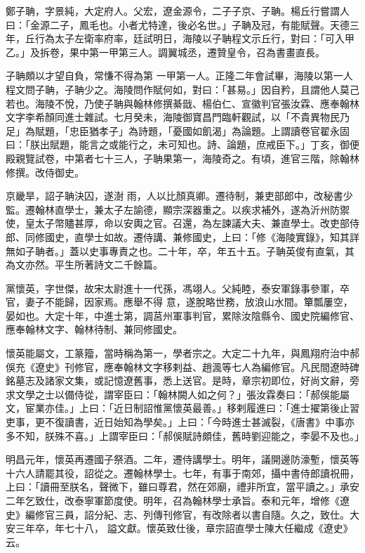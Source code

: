 \begin{pinyinscope}
 鄭子聃，字景純，大定府人。父宏，遼金源令，二子子京、子聃。楊丘行嘗謂人曰：「金源二子，鳳毛也。小者尤特達，後必名世。」子聃及冠，有能賦聲。天德三年，丘行為太子左衛率府率，廷試明日，海陵以子聃程文示丘行，對曰：「可入甲乙。」及拆卷，果中第一甲第三人。調翼城丞，遷贊皇令，召為書畫直長。



 子聃頗以才望自負，常慊不得為第
 一甲第一人。正隆二年會試畢，海陵以第一人程文問子聃，子聃少之。海陵問作賦何如，對曰：「甚易。」因自矜，且謂他人莫己若也。海陵不悅，乃使子聃與翰林修撰綦戩、楊伯仁、宣徽判官張汝霖、應奉翰林文字李希顏同進士雜試。七月癸未，海陵御寶昌門臨軒觀試，以「不貴異物民乃足」為賦題，「忠臣猶孝子」為詩題，「憂國如飢渴」為論題。上謂讀卷官翟永固曰：「朕出賦題，能言之或能行之，未可知也。詩、論題，庶戒臣下。」丁亥，御便殿親覽試卷，中第者七十三人，子聃果第一，海陵奇之。有頃，進官三階，除翰林修撰。改侍御史。



 京畿旱，詔子聃決囚，遂澍
 雨，人以比顏真卿。遷待制，兼吏部郎中，改秘書少監。遷翰林直學士，兼太子左諭德，顯宗深器重之。以疾求補外，遂為沂州防禦使，皇太子幣贐甚厚，命以安輿之官。召還，為左諫議大夫、兼直學士。改吏部侍郎、同修國史，直學士如故。遷侍講、兼修國史，上曰：「修《海陵實錄》，知其詳無如子聃者。」蓋以史事專責之也。二十年，卒，年五十五。子聃英俊有直氣，其為文亦然。平生所著詩文二千餘篇。



 黨懷英，字世傑，故宋太尉進十一代孫，馮翊人。父純睦，泰安軍錄事參軍，卒官，妻子不能歸，因家焉。應舉不得
 意，遂脫略世務，放浪山水間。簞瓢屢空，晏如也。大定十年，中進士第，調莒州軍事判官，累除汝陰縣令、國史院編修官、應奉翰林文字、翰林待制、兼同修國史。



 懷英能屬文，工篆籀，當時稱為第一，學者宗之。大定二十九年，與鳳翔府治中郝俁充《遼史》刊修官，應奉翰林文字移剌益、趙渢等七人為編修官。凡民間遼時碑銘墓志及諸家文集，或記憶遼舊事，悉上送官。是時，章宗初即位，好尚文辭，旁求文學之士以備侍從，謂宰臣曰：「翰林闕人如之何？」張汝霖奏曰：「郝俁能屬文，宦業亦佳。」上曰：「近日制詔惟黨懷英最善。」移剌履進曰：「進士擢第後止習
 吏事，更不復讀書，近日始知為學矣。」上曰：「今時進士甚滅裂，《唐書》中事亦多不知，朕殊不喜。」上謂宰臣曰：「郝俁賦詩頗佳，舊時劉迎能之，李晏不及也。」



 明昌元年，懷英再遷國子祭酒。二年，遷侍講學士。明年，議開邊防濠塹，懷英等十六人請罷其役，詔從之。遷翰林學士。七年，有事于南郊，攝中書侍郎讀祝冊，上曰：「讀冊至朕名，聲微下，雖曰尊君，然在郊廟，禮非所宜，當平讀之。」承安二年乞致仕，改泰寧軍節度使。明年，召為翰林學士承旨。泰和元年，增修《遼史》編修官三員，詔分紀、志、列傳刊修官，有改除者以書自隨。久之，致仕。大安三年卒，年七十八，
 謚文獻。懷英致仕後，章宗詔直學士陳大任繼成《遼史》云。



\end{pinyinscope}